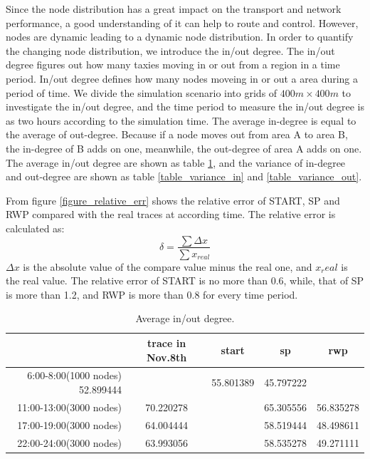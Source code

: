 Since the node distribution has a great impact on the transport and network performance, a good understanding of it can help to route and control.  However, nodes are dynamic leading to a dynamic node distribution. In order to quantify the changing node distribution,  we introduce the in/out degree. The in/out degree figures out how many taxies moving in or out from a region in a time period. In/out degree defines how many nodes moveing in or out a area during a period of time. 
We divide the simulation scenario into grids of $ 400m \times 400 m$ to investigate the in/out degree, and the time period to measure the in/out degree is as two hours according to the simulation time. 
The average in-degree is equal to the average of out-degree. Because if a node moves out from area A to area B, the in-degree of B adds on one, meanwhile, the out-degree of area A adds on one. The average in/out degree are shown as table \ref{table_avg_inoutdegree}, and the variance of in-degree and out-degree are shown as table \ref{table_variance_in} and \ref{table_variance_out}.

From figure \ref{figure_relative_err} shows the relative error of START, SP and RWP compared with the real traces at according time.
The relative error is calculated as:
\begin{equation}
    \delta = \frac{\sum \Delta x}{\sum x_{real}} 
\end{equation}
$\Delta x$ is the absolute value of the compare value minus the real one, and $x_real$ is the real value.
The relative error of START is no more than 0.6, while, that of SP is more than 1.2,  and RWP is more than 0.8 for every time period. 
\begin{table}[!t]
\caption{Average in/out degree.}\label{table_avg_inoutdegree}
\centering
\begin{tabular}{r|c|c|c|c}
\hline
	&trace in Nov.8th	&start	&sp	&rwp	\\
\hline
6:00-8:00(1000 nodes)
52.899444&&55.801389	&45.797222\\
\hline
11:00-13:00(3000 nodes)&
70.220278&&	65.305556&	56.835278\\  
\hline
17:00-19:00(3000 nodes)&
64.004444&&	58.519444&	48.498611\\
\hline
22:00-24:00(3000 nodes)&
63.993056&&	58.535278&	49.271111\\	
\hline
\end{tabular}
\end{table}

